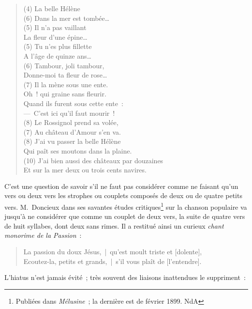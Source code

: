\documentclass[french,twoside]{book} %
\begin{document}
\begin{verse}
(4) La belle Hélène\\
(6) Dans la mer est tombée…\\
(5) Il n’a pas vaillant\\
La fleur d’une épine…\\
(5) Tu n’es plus fillette\\
A l’âge de quinze ans…\\
(6) Tambour, joli tambour,\\
Donne-moi ta fleur de rose…\\
(7) Il la mène sous une ente.\\
Oh ! qui graine sans fleurir.\\
Quand ils furent sous cette ente :\\
— C’est ici qu’il faut mourir !\\
(8) Le Rossignol prend sa volée,\\
(7) Au château d’Amour s’en va.\\
(8) J’ai vu passer la belle Hélène\\
Qui paît ses moutons dans la plaine.\\
(10) J’ai bien aussi des châteaux par douzaines\\
Et sur la mer deux ou trois cents navires.\\
\end{verse}

\noindent C’est une question de savoir s’il ne faut pas considérer comme ne faisant qu’un vers ou deux vers les strophes ou couplets composés de deux ou de quatre petits vers. M. Doncieux dans ses savantes études critiques\footnote{ Publiées dans {\itshape Mélusine} ; la dernière est de février 1899. NdA} sur la chanson populaire va jusqu’à ne considérer que comme un couplet de deux vers, la suite de quatre vers de huit syllabes, dont deux sans rimes. Il a restitué ainsi un curieux {\itshape chant monorime de la Passion} :\par


\begin{verse}
La passion du doux Jésus, | qu’est moult triste et [dolente],\\
Ecoutez-la, petits et grands, | s’il vous plaît de [l’entendre].\\
\end{verse}

\noindent L’hiatus n’est jamais évité ; très souvent des liaisons inattendues le suppriment :\par
\end{document}

